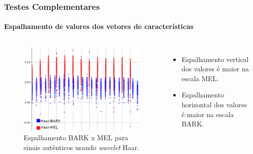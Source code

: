 \begin{frame}
	\frametitle{Testes Complementares}
		\framesubtitle{Espalhamento de valores dos vetores de características}

		\begin{columns}
			\begin{figure}
				\centering
				\includegraphics[width=\linewidth]{images/results/BarkVersusMelOnHaar}
				\caption{Espalhamento BARK x MEL para sinais autênticos usando \textit{wavelet} Haar.}
				\label{fig:barkversusmelonhaar}
			\end{figure}
			\begin{itemize}
				\item Espalhamento vertical dos valores é maior na escala MEL.
				\item Espalhamento horizontal dos valores é maior na escala BARK.
			\end{itemize}
		\end{columns}		
	
\end{frame}